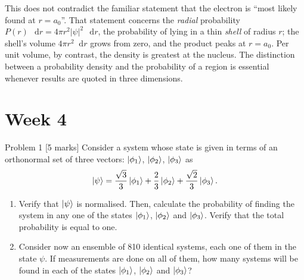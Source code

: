 \documentclass[12pt]{article}
\renewcommand{\d}{\mathop{}\!\mathrm{d}}
\begin{document}
\begin{insightbox}
This does not contradict the familiar statement that the electron is ``most likely found at $r=a_0$''. That statement concerns the \emph{radial} probability $P(r)\,\d r=4\pi r^2|\psi|^2\,\d r$, the probability of lying in a thin \emph{shell} of radius $r$; the shell's volume $4\pi r^2\d r$ grows from zero, and the product peaks at $r=a_0$. Per unit volume, by contrast, the density is greatest at the nucleus. The distinction between a probability density and the probability of a region is essential whenever results are quoted in three dimensions.
\end{insightbox}
\fi


\newpage
\section{Week 4}

\begin{problembox}{Problem 1 \hfill [5 marks]}
Consider a system whose state is given in terms of an orthonormal set of three vectors: $\ket{\phi_1}$, $\ket{\phi_2}$, $\ket{\phi_3}$ as
\[
\ket{\psi}=\frac{\sqrt{3}}{3}\ket{\phi_1}+\frac{2}{3}\ket{\phi_2}+\frac{\sqrt{2}}{3}\ket{\phi_3}.
\]

\begin{enumerate}
    \item Verify that $\ket{\psi}$ is normalised. Then, calculate the probability of finding the system in any one of the states $\ket{\phi_1}$, $\ket{\phi_2}$ and $\ket{\phi_3}$. Verify that the total probability is equal to one.
    \item Consider now an ensemble of 810 identical systems, each one of them in the state $\psi$. If measurements are done on all of them, how many systems will be found in each of the states $\ket{\phi_1}$, $\ket{\phi_2}$ and $\ket{\phi_3}$?
\end{enumerate}
\end{problembox}
\end{document}
